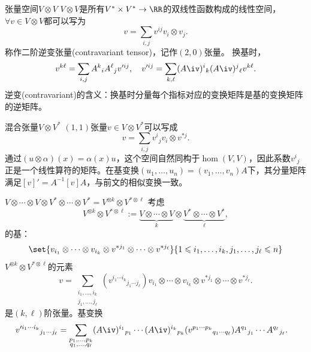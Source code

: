 \begin{example}{张量空间$V\otimes V$}{}
	$V\otimes V$是所有$V^\ast\times V^\ast\to\RR$的双线性函数构成的线性空间，%
	$\forall v\in V\otimes V$都可以写为
	\[
		v=\sum_{i,j}v^{ij}v_i\otimes v_j.
	\]
	称作二阶逆变张量(contravariant tensor)，记作$(2,0)$张量。
	\tcblower
	换基时，
	\[
		v^{k\ell}=\sum_{i,j}A^k{}_iA^\ell{}_jv'^{ij},\quad v'^{ij}=\sum_{k,\ell}(A\iv)^i{}_k(A\iv)^j{}_\ell v^{k\ell}.
	\]
	逆变(contravariant)的含义：换基时分量每个指标对应的变换矩阵是基的变换矩阵的逆矩阵。
\end{example}
\begin{example}{混合张量$V\otimes V^\ast$}{}
	$(1,1)$张量$v\in V\otimes V^\ast$可以写成
	\[
		v=\sum_{i,j}v^i{}_jv_i\otimes v^{\ast j}.
	\]
    通过$(u\otimes\alpha)(x)=\alpha(x)u$，这个空间自然同构于$\hom(V,V)$，因此系数$v^i{}_j$正是一个线性算符的矩阵。在基变换$(u_1,\ldots,u_n)=(v_1,\ldots,v_n)A$下，其分量矩阵满足$[v]'=A^{-1}[v]A$，与前文的相似变换一致。
\end{example}
\begin{example}{$V\otimes\cdots\otimes V\otimes V^\ast\otimes\cdots\otimes V^\ast=V^{\otimes k}\otimes V^{\ast\otimes\ell}$}{}
	考虑
	\[
		V^{\otimes k}\otimes V^{\ast\otimes\ell}:=\underbrace{V\otimes\cdots\otimes V}_k\otimes\underbrace{V^\ast\otimes\cdots\otimes V^\ast}_\ell,
	\]
	的基： 
	\[
		\set{v_{i_1}\otimes\cdots\otimes v_{i_k}\otimes v^{\ast j_1}\otimes\cdots\otimes v^{\ast j_\ell}}{1\leqslant i_1,\ldots,i_k,j_1,\ldots,j_\ell\leqslant n}
	\]
	$V^{\otimes k}\otimes V^{\ast\otimes\ell}$的元素 
	\[
		v=\sum_{\substack{i_1,\ldots,i_k\\j_1,\ldots,j_\ell}}(v^{i_1\cdots i_k}{}_{j_1\cdots j_\ell})v_{i_1}\otimes\cdots\otimes v_{i_k}\otimes v^{\ast j_1}\otimes\cdots\otimes v^{\ast j_\ell}.
	\]
	是$(k,\ell)$阶张量。基变换
	\begin{align*}
		&v'^{i_1\cdots i_k}{}_{j_1\cdots j_\ell}=\sum_{\substack{p_1,\ldots,p_k\\q_1,\ldots,q_\ell}}(A\iv)^{i_1}{}_{p_1}\cdots(A\iv)^{i_k}{}_{p_k}(v^{p_1\cdots p_k}{}_{q_1\cdots q_\ell})A^{q_1}{}_{j_1}\cdots A^{q_\ell}{}_{j_\ell}.
	\end{align*}
\end{example}